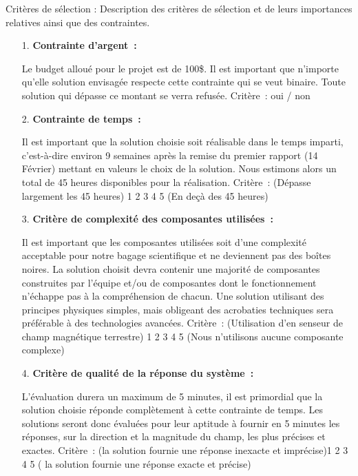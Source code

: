 \documentclass{standalone}
\author{Bastien Gauthier-Soumis,\\
 Edward Halle-Hannan, ,\\
Massine Kadi, ,\\
Félix Pelletier, }
\begin{document}
Critères de sélection : Description des critères de sélection et de leurs importances relatives ainsi que des contraintes.
	
\begin{enumerate}
	\item [1.]
\textbf{	Contrainte d’argent :}
	
	Le budget alloué pour le projet est de 100\$. Il est important que n’importe qu’elle solution envisagée respecte cette contrainte qui se veut binaire. Toute solution qui dépasse ce montant se verra refusée.
	Critère : oui / non\\
	
	
	\item [2.]
	\textbf{Contrainte de temps :}
	
	Il est important que la solution choisie soit réalisable dans le temps imparti, c’est-à-dire environ 9 semaines après la remise du premier rapport (14 Février) mettant en valeurs le choix de la solution. Nous estimons alors un total de 45 heures disponibles pour la réalisation. 
	Critère : (Dépasse largement les 45 heures) 1 2 3 4 5 (En deçà des 45 heures)\\
	
	
	\item [3.]
	\textbf{Critère de complexité des composantes utilisées :}
	
	Il est important que les composantes utilisées soit d’une complexité acceptable pour notre bagage scientifique et ne deviennent pas des boîtes noires. La solution choisit devra contenir une majorité de composantes construites par l’équipe et/ou de composantes dont le fonctionnement n’échappe pas à la compréhension de chacun. Une solution utilisant des principes physiques simples, mais obligeant des acrobaties techniques sera préférable à des technologies avancées.
	Critère : (Utilisation d’en senseur de champ magnétique terrestre) 1 2 3 4 5 (Nous n’utilisons aucune composante complexe)\\
	
	
	\item [4.]
	\textbf{Critère de qualité de la réponse du système :}
	
	L’évaluation durera un maximum de 5 minutes, il est primordial que la solution choisie réponde complètement à cette contrainte de temps. Les solutions seront donc évaluées pour leur aptitude à fournir en 5 minutes les réponses, sur la direction et la magnitude du champ, les plus précises et exactes. 
	Critère : (la solution fournie une réponse inexacte et imprécise)1 2 3 4 5 ( la solution fournie une réponse exacte et précise)\\
	

\end{enumerate}
\end{document}
